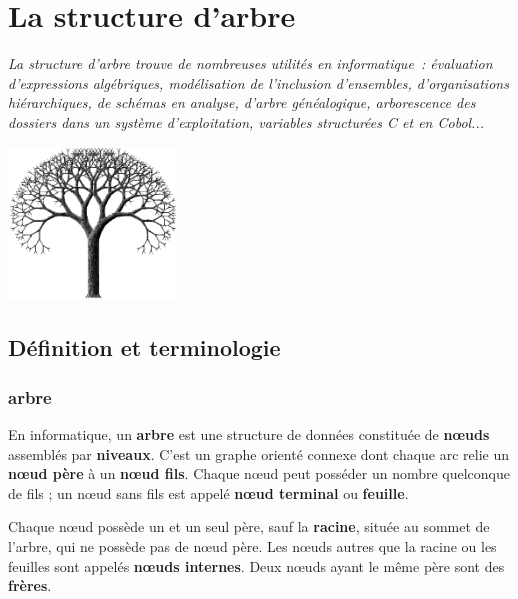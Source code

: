 \chapter{La structure d'arbre}

{\itshape La structure d'arbre trouve de nombreuses utilités en informatique~: 
évaluation d'expressions algébriques, modélisation de l'inclusion d'ensembles,
d'organisations hiérarchiques, de schémas en analyse, d'arbre généalogique, 
arborescence des dossiers dans un système d'exploitation, variables 
structurées C et en Cobol...}
\begin{center}
	\includegraphics[width=4.494cm,height=4.045cm]{image/a2012Logique2eme-img028.png}
\end{center}
	

\section{Définition et terminologie}

	\subsection{arbre}
		En informatique, un \textbf{arbre} est une structure de données 
		constituée de \textbf{n{\oe}uds} assemblés par \textbf{niveaux}. 
		C'est un graphe orienté connexe dont chaque arc relie un 
		\textbf{n{\oe}ud père} à un \textbf{n{\oe}ud fils}. 
		Chaque n{\oe}ud peut posséder un nombre quelconque de fils ; 
		un n{\oe}ud sans fils est appelé \textbf{n{\oe}ud terminal} 
		ou \textbf{feuille}.

		Chaque n{\oe}ud possède un et un seul père, sauf la \textbf{racine}, 
		située au sommet de l'arbre, qui ne possède pas de n{\oe}ud père. 
		Les n{\oe}uds autres que la racine ou les feuilles sont appelés 
		\textbf{n{\oe}uds internes}. Deux n{\oe}uds ayant le même père 
		sont des \textbf{frères}.

